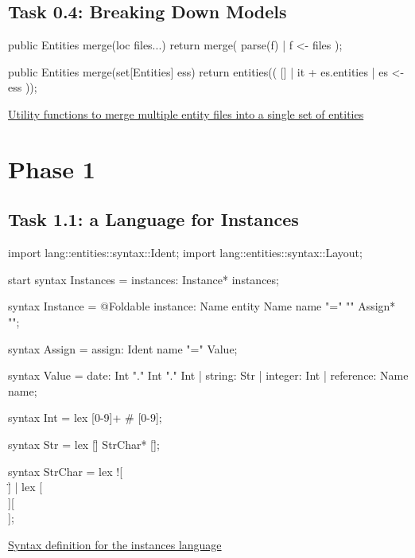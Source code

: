 \documentclass[a4paper]{article}
\def\source#1#2{\href{http://svn.rascal-mpl.org/lwc/trunk/lwc11/src/#1}{#2}}
\begin{document}
\subsection*{Task 0.4: Breaking Down Models}

\begin{listing}
\begin{rascal}
public Entities merge(loc files...) {
    return merge({ parse(f) | f <- files });
}

public Entities merge(set[Entities] ess) {
    return entities(( [] | it + es.entities | es <- ess ));
}
\end{rascal}
\caption{\source{lang/entities/utils/Merge.rsc}{Utility functions to
    merge multiple entity files into a single set of entities}}
\end{listing}



\section{Phase 1}

\subsection*{Task 1.1: a Language for Instances}

\begin{listing}
\begin{rascal}
import lang::entities::syntax::Ident;
import lang::entities::syntax::Layout;

start syntax Instances = instances: Instance* instances;

syntax Instance
    = @Foldable instance: Name entity Name name "=" "{" Assign* "}";
    
syntax Assign = assign: Ident name "=" Value;
    
syntax Value 
    = date: Int "." Int "." Int
    | string: Str
    | integer: Int
    | reference: Name name;
    
syntax Int = lex [0-9]+ # [0-9];

syntax Str = lex [\"] StrChar* [\"];

syntax StrChar = lex ![\\\"] | lex [\\][\"\\];
\end{rascal}
\caption{\source{lang/instances/syntax/Instances.rsc}{Syntax definition for the
    instances language}}\label{LST:instances}
\end{listing}
\end{document}
